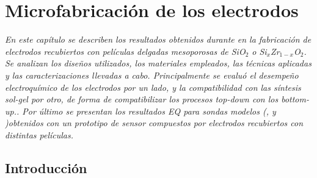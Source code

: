  \newcommand{\NoBiblioMicro}[1]{
 \ifthenelse{\equal{#1}{verdadero}}{}{}
 \NoBiblioMicro{verdadero}}

 
 \FormatoCapituloDosLineas
 
 \chapter{Microfabricación de los electrodos}\label{chap:Microfabricacion}

 \thispagestyle{empty}
	
 \noindent\textit{En este capítulo se describen los resultados obtenidos durante en la fabricación de electrodos recubiertos con películas delgadas mesoporosas de SiO$_2$ o Si$_x$Zr$_{1-x}$O$_2$. Se analizan los diseños utilizados, los materiales empleados, las técnicas aplicadas y las caracterizaciones llevadas a cabo. Principalmente se evaluó el desempeño electroquímico de los electrodos por un lado, y la compatibilidad con las síntesis sol-gel por otro, de forma de compatibilizar los procesos \textit{top-down }con los \textit{bottom-up.}. Por último se presentan los resultados EQ  para sondas modelos (\fe, \ru\space y \fc)obtenidos con un prototipo de sensor compuestos por electrodos recubiertos con distintas películas.}
 
 
 \vfill
 \minitoc
 \newpage

\section{Introducción}
	
